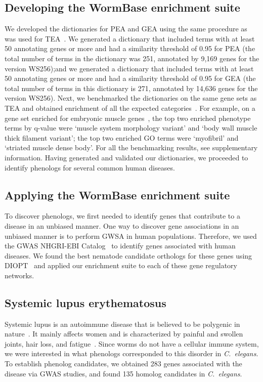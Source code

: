 \documentclass[10pt,letterpaper,twocolumn]{article}
\newcommand{\cel}{\emph{C.~elegans}}
\newcommand{\hlupus}{283}
\newcommand{\wlupus}{135}
\begin{document}
\subsection*{Developing the WormBase enrichment suite}
We developed the dictionaries for PEA and GEA using the same procedure as was
used for TEA~\cite{Angeles-Albores2016}. We generated a dictionary that
included terms with at
least 50 annotating genes or more and had a similarity threshold of 0.95 for PEA
(the total number of terms in the dictionary was 251, annotated by 9,169 genes
 for the version WS256);\@ and we generated a
dictionary that included terms with at least 50 annotating genes or more and
had a similarity threshold of 0.95 for GEA (the total number of terms in this
dictionary is 271, annotated by 14,636 genes for the version WS256).
\@ Next, we benchmarked the dictionaries on the same gene
sets as TEA and obtained enrichment of all the expected
categories~\cite{Gaudet2004a, Spencer2011, Cinar2005, Watson2008a,
Pauli2006, Portman2004, Fox2007, Smith2010}.
For example,
on a gene set enriched for embryonic muscle genes~\cite{Watson2008a},
the top two enriched
phenotype terms by q-value were `muscle system morphology variant' and `body
wall muscle thick filament variant'; the top two enriched GO terms were
`myofibril' and `striated muscle dense body'. For all the benchmarking
results, see supplementary information. Having generated and validated our
dictionaries, we proceeded to identify phenologs for several common human
diseases.

\subsection*{Applying the WormBase enrichment suite}
To discover phenologs, we first needed to identify genes that
contribute to a disease in an unbiased manner. One way to discover gene
associations in an unbiased manner is to perform GWSA in human populations.
Therefore, we used the GWAS NHGRI-EBI
Catalog~\cite{MacArthur2016} to identify genes associated with human diseases. We found the
best nematode candidate orthologs for these genes using DIOPT~\cite{Hu2011} and applied
our enrichment suite to each of these gene regulatory networks.

\subsection*{Systemic lupus erythematosus}
Systemic lupus is an autoimmune disease that is believed to be polygenic in
nature~\cite{Mohan2015}. It mainly affects women and is characterized by painful
and swollen joints, hair loss, and fatigue~\cite{Lisnevskaia2014}. Since worms do not have a
cellular immune system, we were interested in what phenologs corresponded to
this disorder in \cel{}. To establish phenolog candidates, we obtained
\hlupus{} genes associated with the disease via GWAS studies, and found
\wlupus{} homolog candidates in \cel{}.
\end{document}
